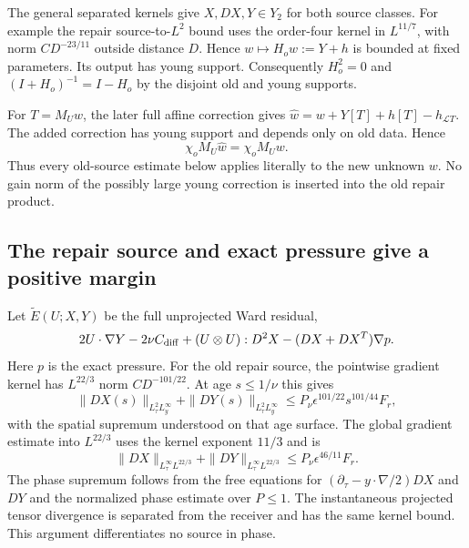 The general separated kernels give $X,DX,Y\in Y_2$ for both
source classes. For example the repair source-to-$L^2$ bound uses
the order-four kernel in $L^{11/7}$, with norm
$CD^{-23/11}$ outside distance $D$. Hence
$w\mapsto H_ow:=Y+h$ is bounded at fixed parameters.
Its output has young support. Consequently $H_o^2=0$ and
$(I+H_o)^{-1}=I-H_o$ by the disjoint old and young supports.

For $T=M_Uw$, the later full affine correction gives
$\widehat w=w+Y[T]+h[T]-h_{\mathcal LT}$. The added correction has
young support and depends only on old data. Hence
\begin{equation}\label{repair:old-invariance}
 \chi_oM_U\widehat w=\chi_oM_Uw.
\end{equation}
Thus every old-source estimate below applies literally to the new
unknown $w$. No gain norm of the possibly large young correction is
inserted into the old repair product.

\subsection{The repair source and exact pressure give a positive margin}

Let $\widetilde E(U;X,Y)$ be the full unprojected Ward residual,
\[
 2U\cdot\nabla Y-2\nu C_{\rm diff}
 +(U\otimes U):D^2X-(DX+DX^T)\nabla p.
\]
Here $p$ is the exact pressure. For the old repair source, the
pointwise gradient kernel has $L^{22/3}$ norm $CD^{-101/22}$.
At age $s\le1/\nu$ this gives
\[
 \|DX(s)\|_{L^2_\tau L^\infty_y}
 +\|DY(s)\|_{L^2_\tau L^\infty_y}
 \le P_\nu\epsilon^{101/22}s^{101/44}F_r,
\]
with the spatial supremum understood on that age surface. The
global gradient estimate into $L^{22/3}$ uses the kernel exponent
$11/3$ and is
\begin{equation}\label{repair:phase-gradient}
 \|DX\|_{L^\infty_\tau L^{22/3}}
 +\|DY\|_{L^\infty_\tau L^{22/3}}
 \le P_\nu\epsilon^{46/11}F_r.
\end{equation}
The phase supremum follows from the free equations for
$(\partial_\tau-y\cdot\nabla/2)DX$ and $DY$ and the normalized
phase estimate over $P\le1$. The instantaneous projected tensor
divergence is separated from the receiver and has the same kernel
bound. This argument differentiates no source in phase.

